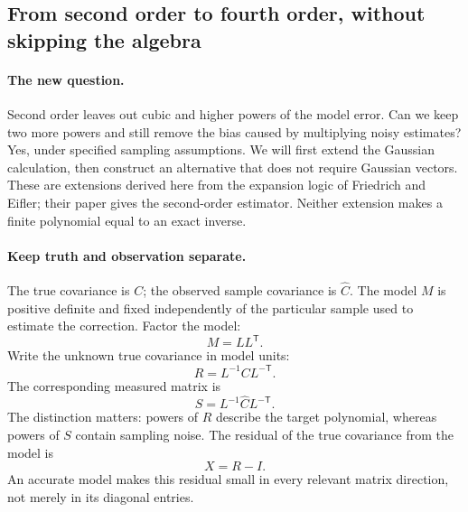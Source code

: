 \documentclass[11pt]{article}
\begin{document}
\subsection{From second order to fourth order, without skipping the algebra}
\label{sec:fourth-order}
\paragraph{The new question.}
Second order leaves out cubic and higher powers of the model error.
Can we keep two more powers and still remove the bias caused by multiplying
noisy estimates? Yes, under specified sampling assumptions. We will first
extend the Gaussian calculation, then construct an alternative that does
not require Gaussian vectors. These are extensions derived here from the
expansion logic of Friedrich and Eifler; their paper gives the second-order
estimator. Neither extension makes a finite polynomial equal to an exact
inverse.

\paragraph{Keep truth and observation separate.}
The true covariance is $C$; the observed sample covariance is $\widehat C$.
The model $M$ is positive definite and fixed independently of the particular
sample used to estimate the correction. Factor the model:
\begin{equation}
 M=LL^{\mathsf T}.
\end{equation}
Write the unknown true covariance in model units:
\begin{equation}
 R=L^{-1}CL^{-\mathsf T}.
\end{equation}
The corresponding measured matrix is
\begin{equation}
 S=L^{-1}\widehat C L^{-\mathsf T}.
\end{equation}
The distinction matters: powers of $R$ describe the target polynomial,
whereas powers of $S$ contain sampling noise. The residual of the true
covariance from the model is
\begin{equation}
 X=R-I.
\end{equation}
An accurate model makes this residual small in every relevant matrix
direction, not merely in its diagonal entries.
\end{document}
